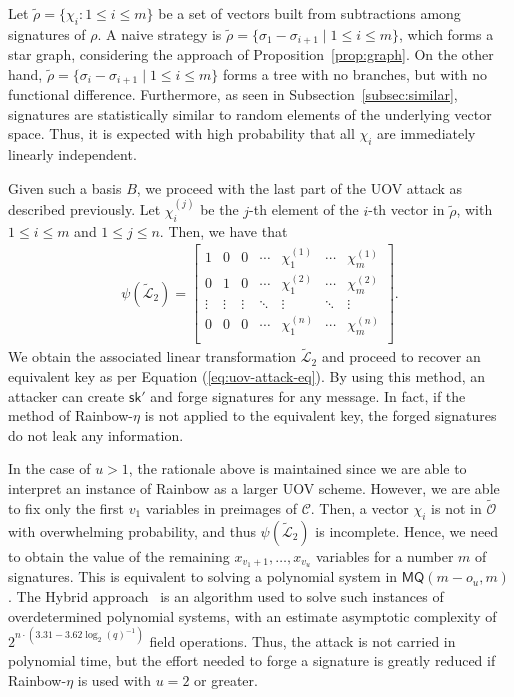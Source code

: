 \documentclass[12pt, a4paper, oneside]{memoir}
\theoremstyle{definition}
\begin{document}
Let $\widetilde{\rho} = \{ \chi_{i} : 1 \leq i \leq m \}$ be a set of vectors built from subtractions among signatures of $\rho$. A naive strategy is
$\widetilde{\rho} = \{ \sigma_{1} - \sigma_{i + 1} \mid 1 \leq i \leq m \}$,
which forms a star graph, considering the approach of Proposition~\ref{prop:graph}. On the other hand, $\widetilde{\rho} = \{ \sigma_{i} - \sigma_{i + 1} \mid 1 \leq i \leq m \}$ forms a tree with no branches, but with no functional difference. Furthermore, as seen in Subsection~\ref{subsec:similar}, signatures are statistically similar to random elements of the underlying vector space. Thus, it is expected with high probability that all $\chi_{i}$ are immediately linearly independent.

Given such a basis $B$, we proceed with the last part of the UOV attack as described previously. Let $\chi_{i}^{(j)}$ be the $j$-th element of the $i$-th vector in $\widetilde{\rho}$, with $1 \leq i \leq m$ and $1 \leq j \leq n$. Then, we have that
\begin{align}
  \psi(\widetilde{\mathcal{L}}_{2}) = \begin{bmatrix}
    1 & 0 & 0 & \cdots & \chi_{1}^{(1)} & \cdots & \chi_{m}^{(1)} \\
    0 & 1 & 0 & \cdots & \chi_{1}^{(2)} & \cdots & \chi_{m}^{(2)} \\
    \vdots & \vdots & \vdots & \ddots & \vdots & \ddots & \vdots \\
    0 & 0 & 0 & \cdots & \chi_{1}^{(n)} & \cdots & \chi_{m}^{(n)} \\
  \end{bmatrix}.
\end{align}
We obtain the associated linear transformation $\widetilde{\mathcal{L}}_{2}$ and proceed to recover an equivalent key as per Equation (\ref{eq:uov-attack-eq}). By using this method, an attacker can create $\mathsf{sk'}$ and forge signatures for any message. In fact, if the method of Rainbow-$\eta$ is not applied to the equivalent key, the forged signatures do not leak any information.

In the case of $u > 1$, the rationale above is maintained since we are able to interpret an instance of Rainbow as a larger UOV scheme. However, we are able to fix only the first $v_{1}$ variables in preimages of $\mathcal{C}$. Then, a vector $\chi_{i}$ is not in $\widetilde{\mathcal{O}}$ with overwhelming probability, and thus $\psi(\widetilde{\mathcal{L}}_{2})$ is incomplete. Hence, we need to obtain the value of the remaining $x_{v_{1} + 1}, \dots, x_{v_{u}}$ variables for a number $m$ of signatures. This is equivalent to solving a polynomial system in $\textsf{MQ}(m - o_{u}, m)$. The Hybrid approach~\cite{Bettale:201207} is an algorithm used to solve such instances of overdetermined polynomial systems, with an estimate asymptotic complexity of $2^{n \cdot (3.31 - 3.62 \log_{2} (q)^{-1})}$ field operations. Thus, the attack is not carried in polynomial time, but the effort needed to forge a signature is greatly reduced if Rainbow-$\eta$ is used with $u = 2$ or greater.
\end{document}
